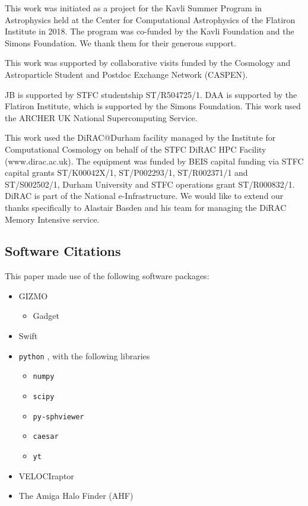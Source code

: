 \documentclass[fleqn,usenatbib]{mnras}
\newcommand{\velociraptor}{{\sc VELOCIraptor}}
\begin{document}
This work was initiated as a project for the Kavli Summer Program in
Astrophysics held at the Center for Computational Astrophysics of the
Flatiron Institute in 2018. The program was co-funded by the Kavli Foundation
and the Simons Foundation. We thank them for their generous support.

This work was supported by collaborative visits funded by the Cosmology and
Astroparticle Student and Postdoc Exchange Network (CASPEN).

JB is supported by STFC studentship ST/R504725/1. DAA is supported by the
Flatiron Institute, which is supported by the Simons Foundation. This work
used the ARCHER UK National Supercomputing Service.

This work used the DiRAC@Durham facility managed by the Institute for
Computational Cosmology on behalf of the STFC DiRAC HPC Facility
(www.dirac.ac.uk). The equipment was funded by BEIS capital funding via STFC
capital grants ST/K00042X/1, ST/P002293/1, ST/R002371/1 and ST/S002502/1,
Durham University and STFC operations grant ST/R000832/1. DiRAC is part of
the National e-Infrastructure. We would like to extend our thanks specifically
to Alastair Basden and his team for managing the DiRAC Memory Intensive service. 

\subsection{Software Citations}

This paper made use of the following software packages:
\begin{itemize}
    \item GIZMO \citep{Hopkins2017}
        \begin{itemize}
            \item Gadget \citep{Springel2005b}
        \end{itemize}
    \item {\sc Swift} \citep{Schaller2016}
    \item {\tt python} \citep{Rossum1995}, with the following libraries
    \begin{itemize}
    	\item {\tt numpy} \citep{Numpy2006}
    	\item {\tt scipy} \citep{Scipy2001}
    	\item {\tt py-sphviewer} \citep{Benitez-Llambay2015}
    	\item {\tt caesar} \citep{Thompson2018}
    	\item {\tt yt} \citep{Turk2011}
    \end{itemize}
    \item \velociraptor{} \citep{Elahi2019}
    \item The Amiga Halo Finder (AHF) \citep{Gill2004, Knollmann2009}
\end{itemize}


 


\end{document}
